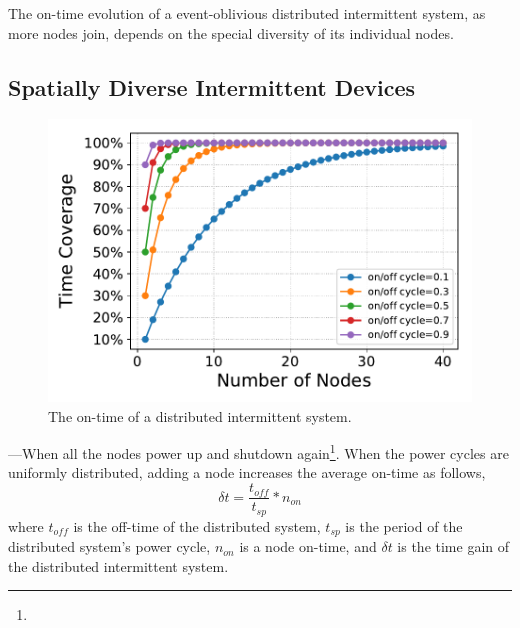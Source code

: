 
The on-time evolution of a event-oblivious distributed intermittent system, as more nodes join, depends on the special diversity of its individual nodes.
\subsection{Spatially Diverse Intermittent Devices}
%
\begin{figure}
	\centering
		\includegraphics[width=\columnwidth]{figures/coverage.pdf}
	\caption{The on-time of a distributed intermittent system.}
	\label{fig:independentCoverage}
\end{figure}
%
---When all the nodes power up and shutdown again\footnote{}. 
When the power cycles are uniformly distributed, adding a node increases the average on-time as follows, 
%
\begin{equation}
\delta t = \frac{t_{off}}{t_{sp}} * n_{on}
		\label{eq:indCov}
\end{equation}
%
where $t_{off}$ is the off-time of the distributed system, $t_{sp}$ is the period of the distributed system's power cycle, $n_{on}$ is a node on-time, and $\delta t$ is the time gain of the distributed intermittent system.

